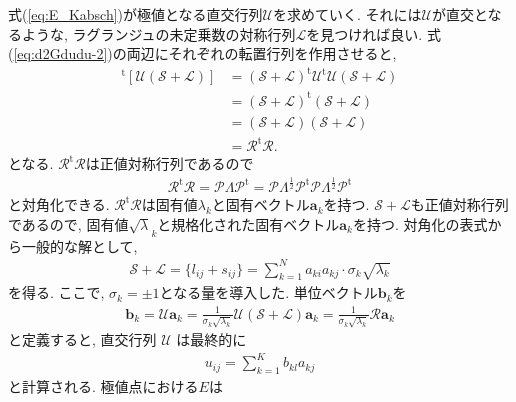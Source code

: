 式(\ref{eq:E_Kabsch})が極値となる直交行列$\mathcal{U}$を求めていく.
それには$\mathcal{U}$が直交となるような, ラグランジュの未定乗数の対称行列$\mathcal{L}$を見つければ良い. 
式(\ref{eq:d2Gdudu-2})の両辺にそれぞれの転置行列を作用させると,
\begin{align}
 [\mathcal{U} (\mathcal{S} + \mathcal{L})]^{\mathrm{t}} [\mathcal{U} (\mathcal{S} + \mathcal{L})]
&=
 (\mathcal{S} + \mathcal{L})^{\mathrm{t}} \mathcal{U}^{\mathrm{t}} \mathcal{U} (\mathcal{S} + \mathcal{L})
 \\
&=
 (\mathcal{S} + \mathcal{L})^{\mathrm{t}} (\mathcal{S} + \mathcal{L})
 \\
&=
 (\mathcal{S} + \mathcal{L}) (\mathcal{S} + \mathcal{L})
 \\
&=
 \mathcal{R}^{\mathrm{t}} \mathcal{R}.
\end{align}
となる.
$\mathcal{R}^{\mathrm{t}} \mathcal{R}$は正値対称行列であるので
\begin{align}
\mathcal{R}^{\mathrm{t}} \mathcal{R}
=
 \mathcal{P} \Lambda \mathcal{P}^{\mathrm{t}}
=
 \mathcal{P} \Lambda^{\frac{1}{2}} \mathcal{P}^{\mathrm{t}} \mathcal{P} \Lambda^{\frac{1}{2}} \mathcal{P}^{\mathrm{t}}
\end{align}
と対角化できる. 
$\mathcal{R}^{\mathrm{t}} \mathcal{R}$は固有値$\lambda_{k}$と固有ベクトル$\mathbf{a}_{k}$を持つ.
$\mathcal{S} +\mathcal{L}$も正値対称行列であるので, 固有値$\sqrt{\lambda}_{k}$と規格化された固有ベクトル$\mathbf{a}_{k}$を持つ.
対角化の表式から一般的な解として, 
\begin{align}
 \mathcal{S} + \mathcal{L} 
= 
 \{l_{ij} + s_{ij}\}
=
 \sum_{k=1}^{N} a_{ki} a_{kj} \cdot \sigma_{k} \sqrt{\lambda_{k}}
\end{align}
を得る. ここで, $\sigma_{k}=\pm1$となる量を導入した. 単位ベクトル$\mathbf{b}_{k}$を
\begin{align}
 \mathbf{b}_{k} 
 =
 \mathcal{U} \mathbf{a}_{k}
 =
 \frac{1}{\sigma_{k} \sqrt{\lambda_{k}}} \mathcal{U}(\mathcal{S} + \mathcal{L}) \mathbf{a}_{k}
 =
 \frac{1}{\sigma_{k} \sqrt{\lambda_{k}}} \mathcal{R} \mathbf{a}_{k}
\end{align}
と定義すると, 直交行列 $\mathcal{U}$ は最終的に
\begin{align}
 u_{ij} = \sum_{k=1}^{K} b_{kl} a_{kj}
\end{align}
と計算される.
極値点における$E$は
